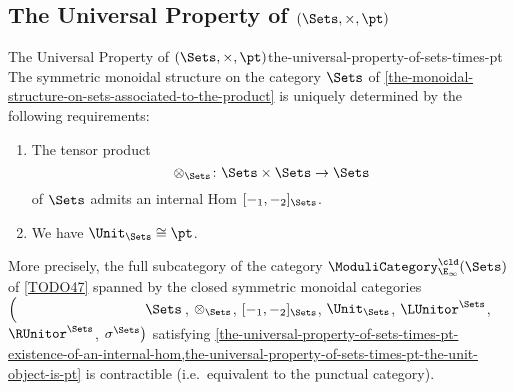 \subsection{The Universal Property of $(\Sets,\times,\pt)$}\label{subsection-the-universal-property-of-sets-times-pt}
\begin{theorem}{The Universal Property of $(\Sets,\times,\pt)$}{the-universal-property-of-sets-times-pt}%
    The symmetric monoidal structure on the category $\Sets$ of \cref{the-monoidal-structure-on-sets-associated-to-the-product} is uniquely determined by the following requirements:
    \begin{enumerate}
        \item\label{the-universal-property-of-sets-times-pt-existence-of-an-internal-hom}The tensor product
            \[
                \otimes_{\Sets}%
                \colon
                \Sets\times\Sets
                \to
                \Sets
            \]%
            of $\Sets$ admits an internal Hom $[-_{1},-_{2}]_{\Sets}$.
        \item\label{the-universal-property-of-sets-times-pt-the-unit-object-is-pt}We have $\Unit_{\Sets}\cong\pt$.
    \end{enumerate}
    More precisely, the full subcategory of the category $\ModuliCategory^{\cld}_{\E_{\infty}}(\Sets)$ of \cref{TODO47} spanned by the closed symmetric monoidal categories $\left(\phantom{\mrp{\LUnitor^{\Sets}}}\Sets\right.$, $\otimes_{\Sets}$, $[-_{1},-_{2}]_{\Sets}$, $\Unit_{\Sets}$, $\LUnitor^{\Sets}$, $\RUnitor^{\Sets}$, $\left.\sigma^{\Sets}\right)$ satisfying \cref{the-universal-property-of-sets-times-pt-existence-of-an-internal-hom,the-universal-property-of-sets-times-pt-the-unit-object-is-pt} is contractible (i.e.\ equivalent to the punctual category).
\end{theorem}
